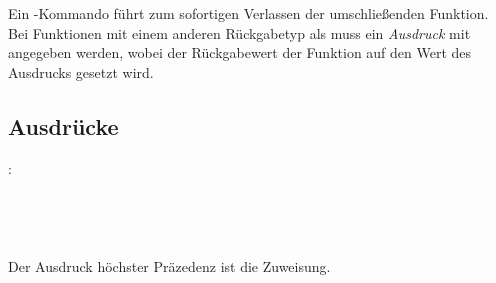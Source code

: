Ein -Kommando führt zum sofortigen Verlassen der umschließenden Funktion.
Bei Funktionen mit einem anderen Rückgabetyp als  muss ein \emph{Ausdruck} mit angegeben
werden, wobei der Rückgabewert der Funktion auf den Wert des Ausdrucks gesetzt wird.

\subsection{Ausdrücke}\label{Ausdruecke}
:\label{ausdruck}\\
\hspace*{1cm} \\
\hspace*{1cm} \\
\hspace*{1cm} \\
\hspace*{1cm} \\

Der Ausdruck höchster Präzedenz ist die Zuweisung.



